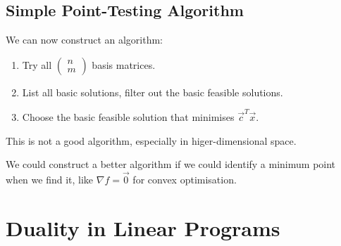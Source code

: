\documentclass[../Main.tex]{subfiles}
\begin{document}
\subsection{Simple Point-Testing Algorithm}
We can now construct an algorithm:
\begin{enumerate}
    \item Try all $\begin{pmatrix} n \\ m \end{pmatrix}$ basis matrices.
    \item List all basic solutions, filter out the basic feasible solutions.
    \item Choose the basic feasible solution that minimises $\vec{c}^T \vec{x}$.
\end{enumerate}
\begin{remarks}
    \item This is not a good algorithm, especially in higer-dimensional space.
    \item We could construct a better algorithm if we could identify a minimum point when we find it, like $\nabla f = \vec{0}$ for convex optimisation.
\end{remarks}
\section{Duality in Linear Programs}
\end{document}
